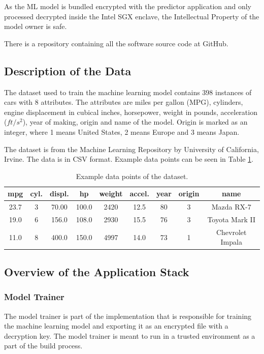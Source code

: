As the ML model is bundled encrypted with the predictor application and only processed decrypted inside the Intel SGX enclave, the Intellectual Property of the model owner is safe.

There is a repository containing all the software source code at GitHub\cite{githubrepo}.

\subsection{Description of the Data} \label{data}

The dataset used to train the machine learning model contains 398 instances of cars with 8 attributes. The attributes are miles per gallon (MPG), cylinders, engine displacement in cubical inches, horsepower, weight in pounds, acceleration ($ft/s^2$), year of making, origin and name of the model. Origin is marked as an integer, where 1 means United States, 2 means Europe and 3 means Japan.

The dataset is from the Machine Learning Repository by University of California, Irvine\cite{dataset}. The data is in CSV format. Example data points can be seen in Table \ref{tab:data}.

\begin{table}
\centering{}\caption{Example data points of the dataset.\label{tab:data}}
\begin{tabular}{|c|c|c|c|c|c|c|c|c|}
mpg & cyl. & displ. & hp & weight & accel. & year & origin & name \tabularnewline
\hline 
23.7 & 3 & 70.00 & 100.0 & 2420 & 12.5 & 80 & 3 & Mazda RX-7 \tabularnewline
19.0 & 6 & 156.0 & 108.0 & 2930 & 15.5 & 76 & 3 & Toyota Mark II \tabularnewline
11.0 & 8 & 400.0 & 150.0 & 4997 & 14.0 & 73 & 1 & Chevrolet Impala \tabularnewline
\end{tabular}
\end{table}

\subsection{Overview of the Application Stack} \label{overview}

\subsubsection{Model Trainer} \label{modeltrainer}

The model trainer is part of the implementation that is responsible for training the machine learning model and exporting it as an encrypted file with a decryption key. The model trainer is meant to run in a trusted environment as a part of the build process.

